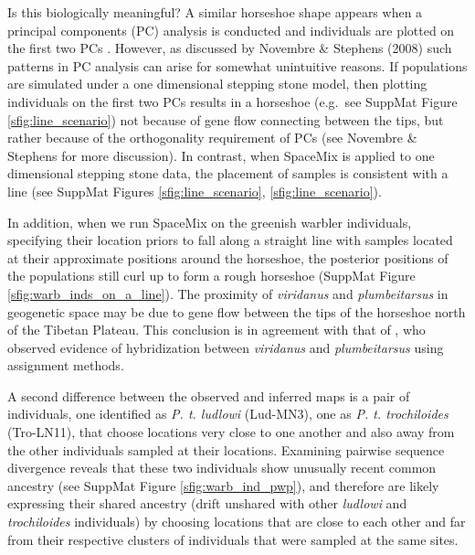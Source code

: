 \documentclass[12pt]{article}
\newcommand{\plr}[1]{{\it\color{green}{(#1)}}}
\begin{document}
Is this biologically meaningful?  A similar horseshoe shape appears when a principal components (PC) analysis is conducted and individuals are plotted on the first two PCs \citep[][see SuppMat Figure \ref{sfig:warb_ind_PC_map}]{alcaide2014genomic}.  However, as discussed by Novembre \& Stephens (2008) such patterns in PC analysis can arise for somewhat unintuitive reasons. If populations are simulated under a one dimensional stepping stone model, then plotting individuals on the first two PCs results in a horseshoe (e.g.\ see SuppMat Figure \ref{sfig:line_scenario}) not because of gene flow connecting between the tips, but rather because of the orthogonality requirement of PCs (see Novembre \& Stephens for more discussion).  In contrast, when SpaceMix is applied to one dimensional stepping stone data, the placement of samples is consistent with a line (see SuppMat Figures \ref{sfig:line_scenario}, \ref{sfig:line_scenario}).

In addition, when we run SpaceMix on the greenish warbler individuals, specifying their location priors to fall along a straight line with samples located at their approximate positions around the horseshoe, the posterior positions of the populations still curl up to form a rough horseshoe (SuppMat Figure \ref{sfig:warb_inds_on_a_line}). The proximity of \textit{viridanus} and \textit{plumbeitarsus} in geogenetic space may be due to gene flow between the tips of the horseshoe north of the Tibetan Plateau. This conclusion is in agreement with that of \citet{alcaide2014genomic}, who observed evidence of hybridization between \textit{viridanus} and \textit{plumbeitarsus} using assignment methods.

A second difference between the observed and inferred maps is a pair of individuals, one identified as \textit{P. t. ludlowi} (Lud-MN3), one as \textit{P. t. trochiloides} (Tro-LN11), that choose locations very close to one another and also away from the other individuals sampled at their locations. Examining pairwise sequence divergence reveals that these two individuals show unusually recent common ancestry (see SuppMat Figure \ref{sfig:warb_ind_pwp}), and therefore are likely expressing their shared ancestry (drift unshared with other \textit{ludlowi} and \textit{trochiloides} individuals) by choosing locations that are close to each other and far from their respective clusters of individuals that were sampled at the same sites.
\plr{Like, they're siblings? If we throw one out does the other go back with the rest?  Could do a marginal check: keep the positions of others fixed and just look for best marginal location of that one.}
\end{document}
